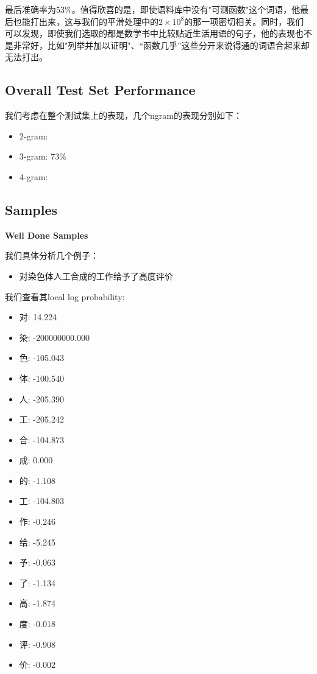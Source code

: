 \documentclass{article}
\begin{document}
最后准确率为$53\%$。值得欣喜的是，即使语料库中没有"可测函数"这个词语，他最后也能打出来，这与我们的平滑处理中的$2\times10^8$的那一项密切相关。同时，我们可以发现，即使我们选取的都是数学书中比较贴近生活用语的句子，他的表现也不是非常好，比如"列举并加以证明"、“函数几乎”这些分开来说得通的词语合起来却无法打出。

\subsection{Overall Test Set Performance}

我们考虑在整个测试集上的表现，几个ngram的表现分别如下：

\begin{itemize}
	\item 2-gram:
	\item 3-gram: $73\%$
	\item 4-gram: 
\end{itemize}

\subsection{Samples}

\noindent \textbf{Well Done Samples}

我们具体分析几个例子：

\begin{itemize}
	\item 对染色体人工合成的工作给予了高度评价
\end{itemize}

我们查看其local log probability:

\begin{itemize}
    \item 对: 14.224
    \item 染: -200000000.000
    \item 色: -105.043
    \item 体: -100.540
    \item 人: -205.390
    \item 工: -205.242
    \item 合: -104.873
    \item 成: 0.000
    \item 的: -1.108
    \item 工: -104.803
    \item 作: -0.246
    \item 给: -5.245
    \item 予: -0.063
    \item 了: -1.134
    \item 高: -1.874
    \item 度: -0.018
    \item 评: -0.908
    \item 价: -0.002
\end{itemize}
\end{document}
